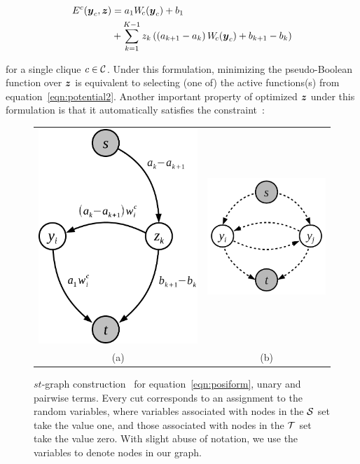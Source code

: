 \documentclass[sigconf, anonymous, review]{acmart}
\renewcommand{\cite}{\citep}
\begin{document}
\begin{align}
  E^c({\boldsymbol{y}}_c, {\boldsymbol{z}}) &= a_1 W_{\!c}({\boldsymbol{y}}_c) + b_1 \notag \\
  &+ \sum_{k = 1}^{K-1} z_k \left( \left(a_{k+1} - a_k\right) W_{\!c}({\boldsymbol{y}}_c) + b_{k+1} - b_k \right)
  \label{eqn:binary_concave_z}
\end{align}

\noindent for a single clique $c \in {\cal C}$. Under this formulation,
minimizing the pseudo-Boolean function over ${\boldsymbol{z}}$ is equivalent
to selecting (one of) the active functions(s) from
equation~\eqref{eqn:potential2}. Another important property of
optimized ${\boldsymbol{z}}$ under this formulation is that it automatically
satisfies the constraint~\cite{gouldlearning}:

\begin{figure}[t]
  \centering
  \setlength{\tabcolsep}{2pt}
  \begin{tabular}{cc}
    \includegraphics[width=0.45\columnwidth]{Methodology/figures/stmincut}&
                                                                         \includegraphics[width=0.5\columnwidth]{Methodology/figures/unary_pairwise.png}\\
                                                                         {\small (a)} & {\small (b)} 
  \end{tabular}
  \caption{\label{fig:stmincut} $st$-graph
    construction~\cite{gouldlearning} for
    equation~\eqref{eqn:posiform}, unary and pairwise terms.
    Every cut corresponds to an assignment to the random
    variables, where variables associated with nodes in the
    ${\cal S}$ set take the value one, and those associated with
    nodes in the ${\cal T}$ set take the value zero. With slight abuse
    of notation, we use the variables to denote nodes in our
    graph.}
\end{figure}
\end{document}
